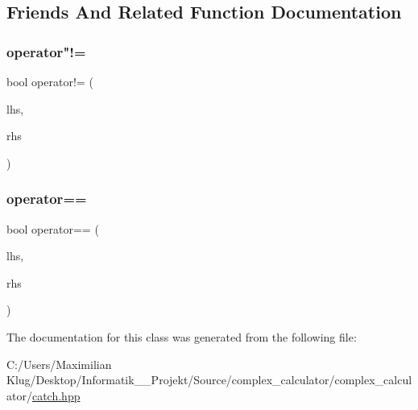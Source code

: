 \subsection{Friends And Related Function Documentation}
\mbox{\label{class_catch_1_1_simple_pcg32_a4940863fe85f6c5a2fa9b3910bfb7406}} 
\subsubsection{\texorpdfstring{operator"!=}{operator!=}}
{\footnotesize\ttfamily bool operator!= (\begin{DoxyParamCaption}\item[{\mbox{\hyperlink{class_catch_1_1_simple_pcg32}{Simple\+Pcg32}} const \&}]{lhs,  }\item[{\mbox{\hyperlink{class_catch_1_1_simple_pcg32}{Simple\+Pcg32}} const \&}]{rhs }\end{DoxyParamCaption})\hspace{0.3cm}{\ttfamily [friend]}}

\mbox{\label{class_catch_1_1_simple_pcg32_a3f1e143181b91f902ce034e2878f87eb}} 
\subsubsection{\texorpdfstring{operator==}{operator==}}
{\footnotesize\ttfamily bool operator== (\begin{DoxyParamCaption}\item[{\mbox{\hyperlink{class_catch_1_1_simple_pcg32}{Simple\+Pcg32}} const \&}]{lhs,  }\item[{\mbox{\hyperlink{class_catch_1_1_simple_pcg32}{Simple\+Pcg32}} const \&}]{rhs }\end{DoxyParamCaption})\hspace{0.3cm}{\ttfamily [friend]}}



The documentation for this class was generated from the following file\+:\begin{DoxyCompactItemize}
\item 
C\+:/\+Users/\+Maximilian Klug/\+Desktop/\+Informatik\+\_\+\_\+\+Projekt/\+Source/complex\+\_\+calculator/complex\+\_\+calculator/\mbox{\hyperlink{catch_8hpp}{catch.\+hpp}}\end{DoxyCompactItemize}
